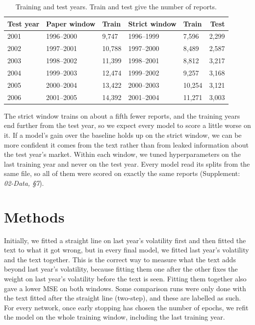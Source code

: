 \documentclass[11pt,a4paper]{article}
\newcommand{\supp}[1]{(Supplement: \textit{#1})}
\begin{document}
\begin{table}[ht]
  \centering
  \small
  \caption{Training and test years. Train and test give the number of reports.}\label{tab:splits}
  \begin{tabular}{@{}lllllr@{}}
    \toprule
    Test year & Paper window & Train & Strict window & Train & Test \\
    \midrule
    2001 & 1996--2000 & 9,747 & 1996--1999 & 7,596 & 2,299 \\
    2002 & 1997--2001 & 10,788 & 1997--2000 & 8,489 & 2,587 \\
    2003 & 1998--2002 & 11,399 & 1998--2001 & 8,812 & 3,217 \\
    2004 & 1999--2003 & 12,474 & 1999--2002 & 9,257 & 3,168 \\
    2005 & 2000--2004 & 13,422 & 2000--2003 & 10,254 & 3,121 \\
    2006 & 2001--2005 & 14,392 & 2001--2004 & 11,271 & 3,003 \\
    \bottomrule
  \end{tabular}
\end{table}

The strict window trains on about a fifth fewer reports, and the training years end further from the test year, so we expect every model to score a little worse on it. If a model's gain over the baseline holds up on the strict window, we can be more confident it comes from the text rather than from leaked information about the test year's market. Within each window, we tuned hyperparameters on the last training year and never on the test year. Every model read its splits from the same file, so all of them were scored on exactly the same reports \supp{02-Data, \S7}.

\section{Methods}\label{sec:methods}

Initially, we fitted a straight line on last year's volatility first and then fitted the text to what it got wrong, but in every final model, we fitted last year's volatility and the text together. This is the correct way to measure what the text adds beyond last year's volatility, because fitting them one after the other fixes the weight on last year's volatility before the text is seen. Fitting them together also gave a lower MSE on both windows. Some comparison runs were only done with the text fitted after the straight line (two-step), and these are labelled as such. For every network, once early stopping has chosen the number of epochs, we refit the model on the whole training window, including the last training year.
\end{document}

